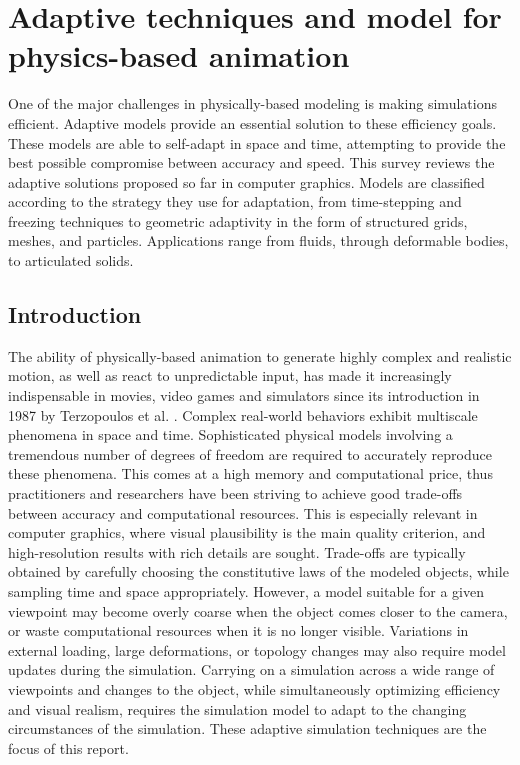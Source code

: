 
\section{Adaptive techniques and model for physics-based animation}

One of the major challenges in physically-based modeling is making simulations efficient. Adaptive models provide an essential solution to these efficiency goals. These models are able to self-adapt in space and time, attempting to provide the best possible compromise between accuracy and speed.
This survey reviews the adaptive solutions proposed so far in computer graphics. Models are classified according to the strategy they use for adaptation, from time-stepping and freezing techniques to geometric adaptivity in the form of structured grids, meshes, and particles. Applications range from fluids, through deformable bodies, to articulated solids.

\subsection{Introduction}
The ability of physically-based animation to generate highly complex and realistic motion, as well as react to unpredictable input, has made it increasingly indispensable in movies, video games and simulators since its introduction in 1987 by Terzopoulos et al. \cite{Terzopoulos1987}.
Complex real-world behaviors exhibit multiscale phenomena in space and time.
Sophisticated physical models involving a tremendous number of degrees of freedom are required to accurately reproduce these phenomena.
This comes at a high memory and computational price, thus practitioners and researchers have been striving to achieve good trade-offs between accuracy and computational resources.
This is especially relevant in computer graphics, where visual plausibility is the main quality criterion, and high-resolution results with rich details are sought.
Trade-offs are typically obtained by carefully choosing the constitutive laws of the modeled objects, while sampling time and space appropriately.
However, a model suitable for a given viewpoint may become overly coarse when the object comes closer to the camera, or waste computational resources when it is no longer visible. Variations in external loading, large deformations, or topology changes may also require model updates during the simulation.
Carrying on a simulation across a wide range of viewpoints and changes to the object, while simultaneously optimizing efficiency and visual realism, requires the simulation model to adapt to the changing circumstances of the simulation.
These adaptive simulation techniques are the focus of this report.

